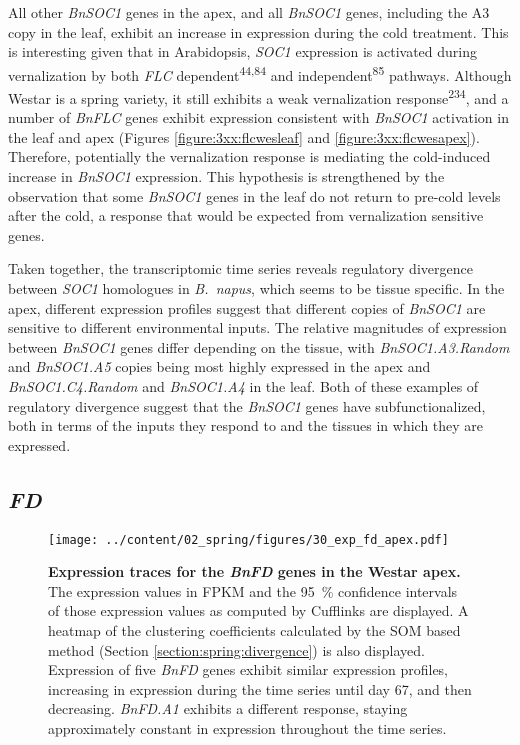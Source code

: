 \documentclass[12pt,]{book}
\begin{document}
All other \emph{BnSOC1} genes in the apex, and all \emph{BnSOC1} genes,
including the A3 copy in the leaf, exhibit an increase in expression
during the cold treatment. This is interesting given that in
Arabidopsis, \emph{SOC1} expression is activated during vernalization by
both \emph{FLC} dependent\textsuperscript{44,84} and
independent\textsuperscript{85} pathways. Although Westar is a spring
variety, it still exhibits a weak vernalization
response\textsuperscript{234}, and a number of \emph{BnFLC} genes
exhibit expression consistent with \emph{BnSOC1} activation in the leaf
and apex (Figures \ref{figure:3xx:flcwesleaf} and
\ref{figure:3xx:flcwesapex}). Therefore, potentially the vernalization
response is mediating the cold-induced increase in \emph{BnSOC1}
expression. This hypothesis is strengthened by the observation that some
\emph{BnSOC1} genes in the leaf do not return to pre-cold levels after
the cold, a response that would be expected from vernalization sensitive
genes.

Taken together, the transcriptomic time series reveals regulatory
divergence between \emph{SOC1} homologues in \emph{B.~napus}, which
seems to be tissue specific. In the apex, different expression profiles
suggest that different copies of \emph{BnSOC1} are sensitive to
different environmental inputs. The relative magnitudes of expression
between \emph{BnSOC1} genes differ depending on the tissue, with
\emph{BnSOC1.A3.Random} and \emph{BnSOC1.A5} copies being most highly
expressed in the apex and \emph{BnSOC1.C4.Random} and \emph{BnSOC1.A4}
in the leaf. Both of these examples of regulatory divergence suggest
that the \emph{BnSOC1} genes have subfunctionalized, both in terms of
the inputs they respond to and the tissues in which they are expressed.

\subsection{\texorpdfstring{\emph{FD}}{FD}}\label{section:spring:fd}

\begin{figure}[htbp]
\centering
\texttt{[image: ../content/02\_spring/figures/30\_exp\_fd\_apex.pdf]}
\caption{\textbf{Expression traces for the \emph{BnFD} genes in the
Westar apex.} The expression values in FPKM and the 95~\% confidence
intervals of those expression values as computed by Cufflinks are
displayed. A heatmap of the clustering coefficients calculated by the
SOM based method (Section \ref{section:spring:divergence}) is also
displayed. Expression of five \emph{BnFD} genes exhibit similar
expression profiles, increasing in expression during the time series
until day 67, and then decreasing. \emph{BnFD.A1} exhibits a different
response, staying approximately constant in expression throughout the
time series.}\label{figure:230:fdapex}
\end{figure}
\end{document}
